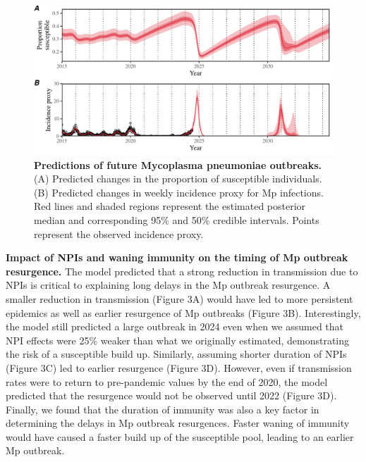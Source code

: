\documentclass[12pt]{article}
\begin{document}
\begin{figure}[!th]
\includegraphics[width=\textwidth]{../figure2/figure2_new.pdf}
\caption{
\textbf{Predictions of future Mycoplasma pneumoniae outbreaks.}
(A) Predicted changes in the proportion of susceptible individuals.
(B) Predicted changes in weekly incidence proxy for Mp infections.
Red lines and shaded regions represent the estimated posterior median and corresponding 95\% and 50\% credible intervals.
Points represent the observed incidence proxy.
}
\end{figure}

\textbf{Impact of NPIs and waning immunity on the timing of Mp outbreak resurgence.}
The model predicted that a strong reduction in transmission due to NPIs is critical to explaining long delays in the Mp outbreak resurgence.
A smaller reduction in transmission (Figure 3A) would have led to more persistent epidemics as well as earlier resurgence of Mp outbreaks (Figure 3B).
Interestingly, the model still predicted a large outbreak in 2024 even when we assumed that NPI effects were 25\% weaker than what we originally estimated, demonstrating the risk of a susceptible build up.
Similarly, assuming shorter duration of NPIs (Figure 3C) led to earlier resurgence (Figure 3D).
However, even if transmission rates were to return to pre-pandemic values by the end of 2020, the model predicted that the resurgence would not be observed until 2022 (Figure 3D).
Finally, we found that the duration of immunity was also a key factor in determining the delays in Mp outbreak resurgences.
Faster waning of immunity would have caused a faster build up of the susceptible pool, leading to an earlier Mp outbreak.
\end{document}
